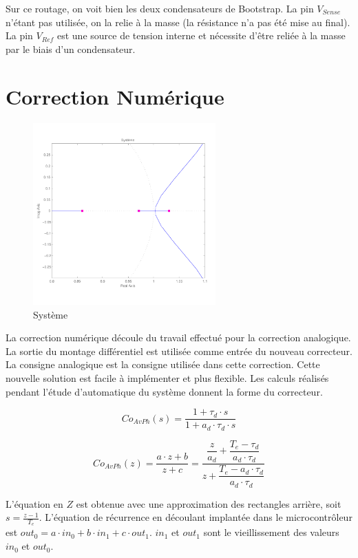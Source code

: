 \documentclass[11pt, french]{article} %
\begin{document}
Sur ce routage, on voit bien les deux condensateurs de Bootstrap. La pin $V_{Sense}$ n'étant pas utilisée, on la relie à la masse (la résistance n'a pas été mise au final). La pin $V_{Ref}$ est une source de tension interne et nécessite d'être reliée à la masse par le biais d'un condensateur. 


\section{Correction Numérique}
\begin{figure}
		
	\includegraphics[width = 7cm,trim=0 1.4cm 0 1.2cm ,clip=true]
					{SolutionNumerique/Systeme.pdf}
	\caption{Système}
\end{figure}
La correction numérique découle du travail effectué pour la correction analogique. La sortie du montage différentiel est utilisée comme entrée du nouveau correcteur. La consigne analogique est la consigne utilisée dans cette correction.
Cette nouvelle solution est facile à implémenter et plus flexible. Les calculs réalisés pendant l'étude d'automatique du système donnent la forme du correcteur.

\[Co_{AvPh}(s)=\dfrac{1+ \tau_d \cdot s}{1 + a_d \cdot \tau_d \cdot s} \]

\[Co_{AvPh}(z)=\dfrac{a \cdot z + b}{z + c}=\dfrac{\dfrac{z}{a_d}+\dfrac{T_e-\tau_d}{a_d \cdot \tau_d} }{z+\dfrac{T_e-a_d \cdot \tau_d}{a_d \cdot \tau_d}}\] 

L'équation en $Z$ est obtenue avec une approximation des rectangles arrière, soit $s=\frac{z-1}{T_e}$. L'équation de récurrence en découlant implantée dans le microcontrôleur est $out_0=a \cdot in_0 + b \cdot in_1 + c \cdot out_1$. 
$in_1$ et $out_1$ sont le vieillissement des valeurs $in_0$ et $out_0$.
\end{document}
